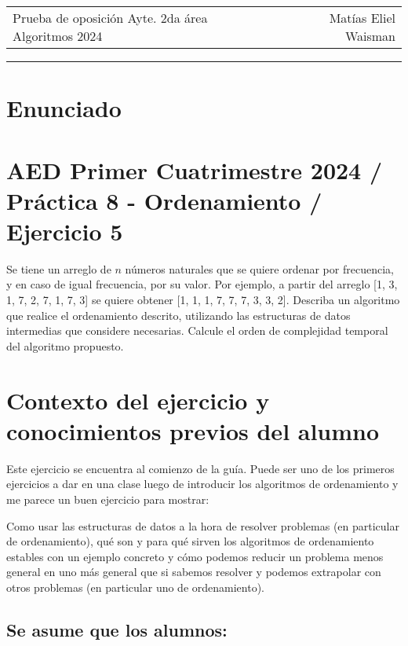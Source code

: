 \documentclass{article}
\begin{document}
\noindent
\vspace{-5pt}
\begin{tabularx}{\textwidth}{Xr}
Prueba de oposición Ayte. 2da área Algoritmos 2024 & Matías Eliel Waisman \\
\end{tabularx}

\noindent\color{black}\rule{\textwidth}{0.4pt}

\vspace{10pt}

\section*{Enunciado}
\section*{\normalsize{AED Primer Cuatrimestre 2024 / Práctica 8 - Ordenamiento / Ejercicio 5}}

Se tiene un arreglo de \(n\) números naturales que se quiere ordenar por frecuencia, y en caso de igual frecuencia, por su valor. Por ejemplo, a partir del arreglo [1, 3, 1, 7, 2, 7, 1, 7, 3] se quiere obtener [1, 1, 1, 7, 7, 7, 3, 3, 2].
Describa un algoritmo que realice el ordenamiento descrito, utilizando las estructuras de datos intermedias que considere necesarias. Calcule el orden de complejidad temporal del algoritmo propuesto.
\vspace*{\fill} %

\newpage %
\section*{Contexto del ejercicio y conocimientos previos del alumno}
Este ejercicio se encuentra al comienzo de la guía. Puede ser uno de los primeros ejercicios a dar en una clase luego de introducir los algoritmos de ordenamiento y me parece un buen ejercicio para mostrar: 

Como usar las estructuras de datos a la hora de resolver problemas (en particular de ordenamiento), qué son y para qué sirven los algoritmos de ordenamiento estables con un ejemplo concreto y cómo podemos reducir un problema menos general en uno más general que si sabemos resolver y podemos extrapolar con otros problemas (en particular uno de ordenamiento). 


\subsection{Se asume que los alumnos:} 
\end{document}
